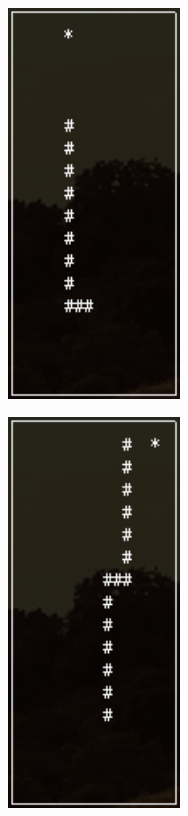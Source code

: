 \documentclass{article}
\begin{document}
\begin{figure}[ht]
\centering
\begin{subfigure}{0.4\textwidth}
\centering
\includegraphics[width=0.5\textwidth]{Figures/game_board_1}
\label{fig:game_board_1}
\end{subfigure}%
\begin{subfigure}{0.4\textwidth}
\centering
\includegraphics[width=0.5\textwidth]{Figures/game_board_2}
\label{fig:game_board_2}
\end{subfigure}


\end{figure}
\end{document}
